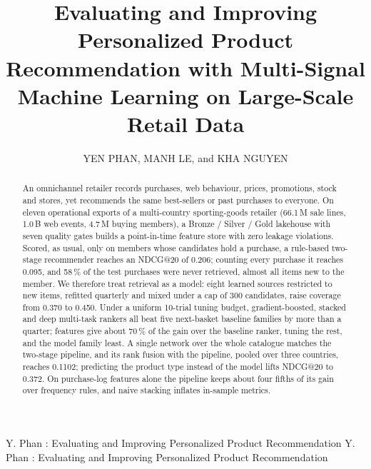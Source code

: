 \documentclass{ieeeaccess}
\makeatletter
\newcommand{\nRefCond}{0.206}        %
\newcommand{\nRefUncond}{0.095}      %
\newcommand{\nNoSource}{58}          %
\newcommand{\nCandOld}{0.370}        %
\newcommand{\nCandNew}{0.450}        %
\newcommand{\nK}{300}                %
\makeatother
\begin{document}
\doi{}

\title{Evaluating and Improving Personalized Product Recommendation with Multi-Signal Machine Learning on Large-Scale Retail
Data}

\author{\uppercase{Yen Phan}, \uppercase{Manh Le}, and
\uppercase{Kha Nguyen}}
\address[1]{University of Information Technology, Vietnam National University, Ho Chi Minh City, Vietnam}
\address[*]{Corresponding authors}

\markboth
{Y. Phan \headeretal: Evaluating and Improving Personalized Product Recommendation}
{Y. Phan \headeretal: Evaluating and Improving Personalized Product Recommendation}


\begin{abstract}
An omnichannel retailer records purchases, web behaviour, prices, promotions, stock and stores, yet recommends the same
best-sellers or past purchases to everyone. On eleven operational exports of a multi-country sporting-goods retailer (66.1\,M sale
lines, 1.0\,B web events, 4.7\,M buying members), a Bronze / Silver / Gold lakehouse with seven quality gates builds a point-in-time
feature store with zero leakage violations. Scored, as usual, only on members whose candidates hold a purchase, a rule-based
two-stage recommender reaches an NDCG@20 of \nRefCond{}; counting every purchase it reaches \nRefUncond{}, and \nNoSource{}\,\% of the
test purchases were never retrieved, almost all items new to the member. We therefore treat retrieval as a model: eight learned
sources restricted to new items, refitted quarterly and mixed under a cap of \nK{} candidates, raise coverage from \nCandOld{} to
\nCandNew{}. Under a uniform 10-trial tuning budget, gradient-boosted, stacked and deep multi-task rankers all beat five next-basket
baseline families by more than a quarter; features give about 70\,\% of the gain over the baseline ranker, tuning the rest, and the
model family least. A single network over the whole catalogue matches the two-stage pipeline, and its rank fusion with the
pipeline, pooled over three countries, reaches 0.1102; predicting the product type instead of the model lifts NDCG@20 to 0.372. On
purchase-log features alone the pipeline keeps about four fifths of its gain over frequency rules, and naive stacking inflates
in-sample metrics.
\end{abstract}
\end{document}
